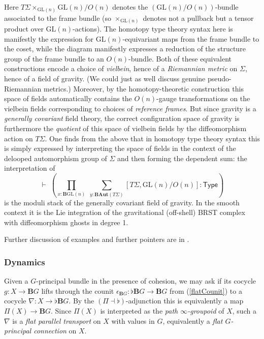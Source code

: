\documentclass[copyright]{eptcs}
\newcommand{\type}{\ensuremath{\mathsf{Type}}\xspace}
\begin{document}
Here $T \Sigma \times_{\mathrm{GL}(n)} \mathrm{GL}(n)/O(n)$ denotes the $(\mathrm{GL}(n)/O(n))$-bundle associated to the frame bundle (so $\times_{\mathrm{GL}(n)}$ denotes not a pullback but a tensor product over $\mathrm{GL}(n)$-actions).
The homotopy type theory syntax here is manifestly the expression for $\mathrm{GL}(n)$-equivariant maps from the
frame bundle to the coset, while the diagram manifestly expresses a reduction of the
structure group of the frame bundle to an $O(n)$-bundle. Both of these equivalent
constructions encode a choice of \emph{vielbein}, hence of a \emph{Riemannian metric}
on $\Sigma$, hence of a field of gravity. (We could just as well discuss
genuine pseudo-Riemannian metrics.) Moreover, by the homotopy-theoretic construction
this space of fields automatically contains the $O(n)$-gauge transformations on the vielbein
fields corresponding to choices of \emph{reference frames}.
But since gravity is a \emph{generally covariant} field theory,  the correct
configuration space of gravity is furthermore the \emph{quotient} of this space of
vielbein fields by the diffeomorphism action on $T \Sigma$. One finds from the above that
in homotopy type theory syntax this is simply expressed by interpreting the
space of fields in the context of the delooped automorphism group of $\Sigma$
and then forming the dependent sum:
the interpretation of
$$
  \vdash\;\left( \prod_{x : \mathbf{B}\mathrm{GL}(n)} \;\sum_{y : \mathbf{B}\mathbf{Aut}(T \Sigma)}
    [T \Sigma, \mathrm{GL}(n)/O(n)] : \type\right)
$$
is the moduli stack of the generally covariant field of gravity. In the
smooth context it is the Lie integration of the gravitational (off-shell) BRST complex with diffeomorphism
ghosts in degree 1.

Further discussion of examples and further
pointers are in \cite{SchreiberLectures, SchreiberErlangen}.




\subsubsection{Dynamics}
\label{Dynamics}

Given a $G$-principal bundle in the presence of cohesion, we may ask if its cocycle $g : X \to \mathbf{B}G$
lifts through the counit $\epsilon_{\mathbf{B}G} : \flat \mathbf{B}G \to \mathbf{B}G$
from (\ref{flatCounit}) to a cocycle
$\nabla : X \to \flat \mathbf{B}G$. By the $(\Pi \dashv \flat)$-adjunction this is equivalently
a map $\Pi(X) \to \mathbf{B}G$. Since $\Pi(X)$ is interpreted as the \emph{path $\infty$-groupoid}
of $X$, such a $\nabla$ is a \emph{flat parallel transport} on $X$ with values in $G$, equivalently
a \emph{flat $G$-principal connection} on $X$.
\end{document}
